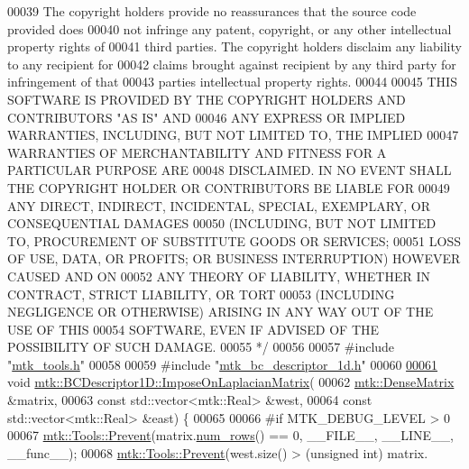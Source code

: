\begin{DoxyCode}
00039 \textcolor{comment}{The copyright holders provide no reassurances that the source code provided does}
00040 \textcolor{comment}{not infringe any patent, copyright, or any other intellectual property rights of}
00041 \textcolor{comment}{third parties. The copyright holders disclaim any liability to any recipient for}
00042 \textcolor{comment}{claims brought against recipient by any third party for infringement of that}
00043 \textcolor{comment}{parties intellectual property rights.}
00044 \textcolor{comment}{}
00045 \textcolor{comment}{THIS SOFTWARE IS PROVIDED BY THE COPYRIGHT HOLDERS AND CONTRIBUTORS "AS IS" AND}
00046 \textcolor{comment}{ANY EXPRESS OR IMPLIED WARRANTIES, INCLUDING, BUT NOT LIMITED TO, THE IMPLIED}
00047 \textcolor{comment}{WARRANTIES OF MERCHANTABILITY AND FITNESS FOR A PARTICULAR PURPOSE ARE}
00048 \textcolor{comment}{DISCLAIMED. IN NO EVENT SHALL THE COPYRIGHT HOLDER OR CONTRIBUTORS BE LIABLE FOR}
00049 \textcolor{comment}{ANY DIRECT, INDIRECT, INCIDENTAL, SPECIAL, EXEMPLARY, OR CONSEQUENTIAL DAMAGES}
00050 \textcolor{comment}{(INCLUDING, BUT NOT LIMITED TO, PROCUREMENT OF SUBSTITUTE GOODS OR SERVICES;}
00051 \textcolor{comment}{LOSS OF USE, DATA, OR PROFITS; OR BUSINESS INTERRUPTION) HOWEVER CAUSED AND ON}
00052 \textcolor{comment}{ANY THEORY OF LIABILITY, WHETHER IN CONTRACT, STRICT LIABILITY, OR TORT}
00053 \textcolor{comment}{(INCLUDING NEGLIGENCE OR OTHERWISE) ARISING IN ANY WAY OUT OF THE USE OF THIS}
00054 \textcolor{comment}{SOFTWARE, EVEN IF ADVISED OF THE POSSIBILITY OF SUCH DAMAGE.}
00055 \textcolor{comment}{*/}
00056 
00057 \textcolor{preprocessor}{#include "\hyperlink{mtk__tools_8h}{mtk\_tools.h}"}
00058 
00059 \textcolor{preprocessor}{#include "\hyperlink{mtk__bc__descriptor__1d_8h}{mtk\_bc\_descriptor\_1d.h}"}
00060 
\hypertarget{mtk__bc__descriptor__1d_8cc_source_l00061}{}\hyperlink{classmtk_1_1BCDescriptor1D_a33e51235eaa930e4470f027001a023cf}{00061} \textcolor{keywordtype}{void} \hyperlink{classmtk_1_1BCDescriptor1D_a33e51235eaa930e4470f027001a023cf}{mtk::BCDescriptor1D::ImposeOnLaplacianMatrix}(
00062     \hyperlink{classmtk_1_1DenseMatrix}{mtk::DenseMatrix} &matrix,
00063     \textcolor{keyword}{const} std::vector<mtk::Real> &west,
00064     \textcolor{keyword}{const} std::vector<mtk::Real> &east) \{
00065 
00066 \textcolor{preprocessor}{  #if MTK\_DEBUG\_LEVEL > 0}
00067   \hyperlink{classmtk_1_1Tools_a332324c6f25e66be9dff48c5987a3b9f}{mtk::Tools::Prevent}(matrix.\hyperlink{classmtk_1_1DenseMatrix_a53f3afb3b6a8d21854458aaa9663cc74}{num\_rows}() == 0, \_\_FILE\_\_, \_\_LINE\_\_, \_\_func\_\_);
00068   \hyperlink{classmtk_1_1Tools_a332324c6f25e66be9dff48c5987a3b9f}{mtk::Tools::Prevent}(west.size() > (\textcolor{keywordtype}{unsigned} int) matrix.

\end{DoxyCode}
